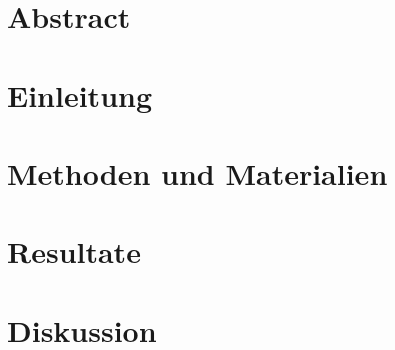 \documentclass[
  a4paper,
  invert-title,
  titleimage-ratio=13
]{bfhpub}
\begin{document}
\section{Abstract}


\tableofcontents

\mainmatter

\clearpage
\section{Einleitung}


\clearpage
\section{Methoden und Materialien}

\clearpage
\section{Resultate}


\clearpage
\section{Diskussion}


\clearpage


\listoffigures
 
\listoftables
 
\lstlistoflistings 
 
\printglossary

\clearpage
\printindex
\appendix
\end{document}
